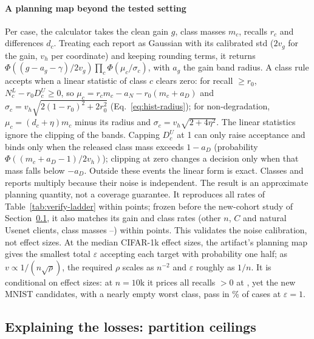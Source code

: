 \paragraph{A planning map beyond the tested setting}
Per case, the calculator takes the clean gain $g$, class masses $m_c$,
recalls $r_c$ and differences $d_c$. Treating each report as Gaussian with its calibrated std ($2v_g$ for the
gain, $v_h$ per coordinate) and keeping rounding terms, it returns $\Phi((g-a_g-\gamma)/2v_g)\prod_c\Phi(\mu_c/\sigma_c)$,
with $a_g$ the gain band radius. A class rule accepts when a linear statistic
of class $c$ clears zero: for recall $\ge r_0$, $N^L_c-r_0D^U_c\ge0$, so
$\mu_c=r_cm_c-a_N-r_0(m_c+a_D)$ and $\sigma_c=v_h\sqrt{2(1-r_0)^2+2r_0^2}$
(Eq.~\eqref{eq:hist-radius}); for non-degradation, $\mu_c=(d_c+\eta)m_c$
minus its radius and $\sigma_c=v_h\sqrt{2+4\eta^2}$. The linear statistics
ignore the clipping of the bands. Capping $D^U_c$ at 1 can only raise
acceptance and binds only when the released class mass exceeds $1-a_D$
(probability $\Phi((m_c+a_D-1)/2v_h)$); clipping at zero changes a decision
only when that mass falls below $-a_D$. Outside these events the linear form
is exact. Classes and reports multiply because their noise is independent. The
result is an approximate planning quantity, not a coverage guarantee. It reproduces
all \CalcCells{} rates of Table~\ref{tab:verify-ladder} within \CalcGap{}
points; frozen before the new-cohort study of Section~\ref{sec:eval:ceiling},
it also matches its \PlanOOSCells{} gain and class rates (other $n$, $C$ and
natural Usenet clients, class masses \UsenetMassMin{}--\UsenetMassMax{})
within \PlanOOSGap{} points. This validates the noise calibration, not
effect sizes. At the median CIFAR-1k effect sizes, the artifact's planning
map gives the smallest total $\varepsilon$ accepting each target with
probability one half; as $v\propto1/(n\sqrt\rho)$, the
required $\rho$ scales as $n^{-2}$ and $\varepsilon$ roughly as $1/n$. It is
conditional on effect sizes: at $n=10$k it prices all recalls $>0$ at
\PlanRecallZeroNTenK{}, yet the new MNIST candidates, with a nearly empty
worst class, pass in \MnistClassOne{}\% of cases at $\varepsilon=1$.

\subsection{Explaining the losses: partition ceilings}
\label{sec:eval:ceiling}




